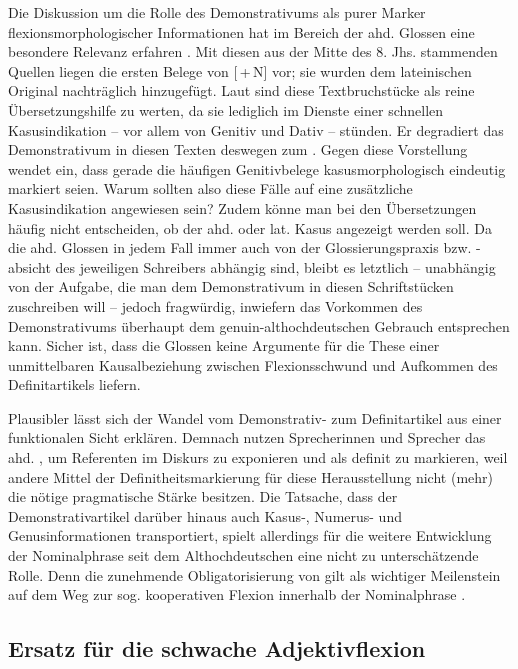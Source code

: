 Die Diskussion um die Rolle des Demonstrativums als purer Marker flexionsmorphologischer Informationen hat im Bereich der ahd. Glossen eine besondere Relevanz erfahren \parencite{Glaser2000}. Mit diesen aus der Mitte des 8. Jhs. stammenden Quellen liegen die ersten Belege von [\,+\,N] vor; sie wurden dem lateinischen Original nachträglich  hinzugefügt. Laut \textcite[12]{Hodler1954} sind diese Textbruchstücke als reine Übersetzungshilfe zu werten, da sie lediglich im Dienste einer schnellen Kasusindikation -- vor allem von Genitiv und Dativ -- stünden. Er degradiert das Demonstrativum in diesen Texten deswegen zum  \parencite[12]{Hodler1954}. Gegen diese Vorstellung wendet \textcite[209f.]{Glaser2000} ein, dass  gerade die häufigen Genitivbelege kasusmorphologisch eindeutig markiert seien. Warum sollten also diese Fälle auf eine zusätzliche Kasusindikation angewiesen sein? Zudem könne man bei den Übersetzungen häufig nicht entscheiden, ob der ahd. oder lat. Kasus angezeigt werden soll. Da die ahd. Glossen in jedem Fall immer auch von der Glossierungspraxis bzw. -absicht des jeweiligen Schreibers abhängig sind, bleibt es letztlich  -- unabhängig von der Aufgabe, die man dem Demonstrativum in diesen Schriftstücken zuschreiben will -- jedoch fragwürdig, inwiefern das Vorkommen des Demonstrativums überhaupt dem genuin-althochdeutschen Gebrauch entsprechen kann. Sicher ist, dass die Glossen keine Argumente für die These einer unmittelbaren Kausalbeziehung zwischen Flexionsschwund und Aufkommen des Definitartikels liefern.

Plausibler lässt sich der Wandel vom Demonstrativ- zum Definitartikel aus einer funktionalen Sicht erklären. Demnach nutzen Sprecherinnen und Sprecher das ahd. , um Referenten im Diskurs zu exponieren und als definit zu markieren, weil andere Mittel der Definitheitsmarkierung für diese Herausstellung nicht (mehr) die nötige pragmatische Stärke besitzen. Die Tatsache, dass der Demonstrativartikel darüber hinaus auch Kasus-, Numerus- und Genusinformationen transportiert, spielt allerdings für die weitere Entwicklung  der Nominalphrase seit dem Althochdeutschen eine nicht zu unterschätzende Rolle. Denn die zunehmende Obligatorisierung von  gilt als wichtiger Meilenstein auf dem Weg zur sog. kooperativen Flexion innerhalb der Nominalphrase \parencite[s. u.a.][]{Ronneberger-Sibold2010a,Szczepaniak2010}.
 
\subsection{Ersatz für die schwache Adjektivflexion} \label{ersatz-schwach}

